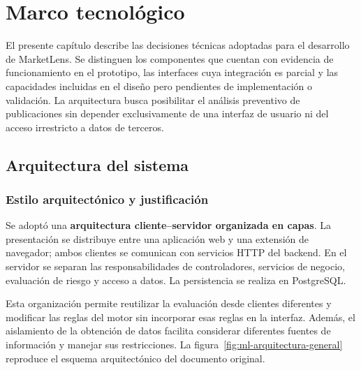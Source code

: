 
\chapter{Marco tecnológico}\label{cap:marco-tecnologico}

El presente capítulo describe las decisiones técnicas adoptadas para el desarrollo de MarketLens. Se distinguen los componentes que cuentan con evidencia de funcionamiento en el prototipo, las interfaces cuya integración es parcial y las capacidades incluidas en el diseño pero pendientes de implementación o validación. La arquitectura busca posibilitar el análisis preventivo de publicaciones sin depender exclusivamente de una interfaz de usuario ni del acceso irrestricto a datos de terceros.

\section{Arquitectura del sistema}\label{sec:ml-arquitectura}

\subsection{Estilo arquitectónico y justificación}\label{subsec:ml-estilo}

Se adoptó una \textbf{arquitectura cliente--servidor organizada en capas}. La presentación se distribuye entre una aplicación web y una extensión de navegador; ambos clientes se comunican con servicios HTTP del backend. En el servidor se separan las responsabilidades de controladores, servicios de negocio, evaluación de riesgo y acceso a datos. La persistencia se realiza en PostgreSQL.

Esta organización permite reutilizar la evaluación desde clientes diferentes y modificar las reglas del motor sin incorporar esas reglas en la interfaz. Además, el aislamiento de la obtención de datos facilita considerar diferentes fuentes de información y manejar sus restricciones. La figura~\ref{fig:ml-arquitectura-general} reproduce el esquema arquitectónico del documento original.

